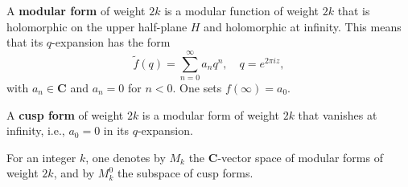 A \textbf{modular form} of weight $2k$ is a modular function of weight $2k$ that is holomorphic on the upper half-plane $H$ and holomorphic at infinity. This means that its $q$-expansion has the form
$$\tilde{f}(q) = \sum_{n=0}^{\infty} a_n q^n, \quad q = e^{2\pi i z},$$
with $a_n \in \mathbf{C}$ and $a_n = 0$ for $n < 0$. One sets $f(\infty) = a_0$.

A \textbf{cusp form} of weight $2k$ is a modular form of weight $2k$ that vanishes at infinity, i.e., $a_0 = 0$ in its $q$-expansion.

For an integer $k$, one denotes by $M_k$ the $\mathbf{C}$-vector space of modular forms of weight $2k$, and by $M_k^0$ the subspace of cusp forms.
